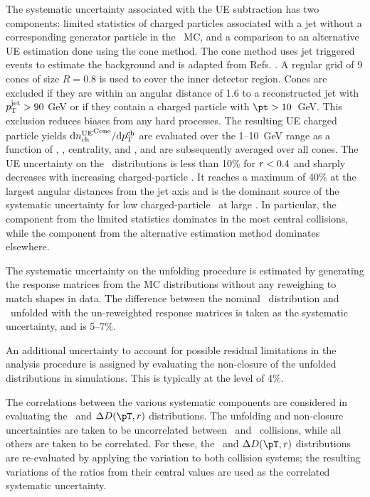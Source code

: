 The systematic uncertainty associated with the UE subtraction has two components: limited statistics of charged particles associated with a jet without a corresponding generator particle in the \pbpb\ MC, and a comparison to an alternative UE estimation done using the cone method. The cone method uses jet triggered events to estimate the background and is adapted from Refs. \cite{Aaboud:2018hpb, Aaboud:2017bzv}. A regular grid of 9 cones of size $R = 0.8$ is used to cover the inner detector region. Cones are excluded if they are within an angular distance of 1.6 to a reconstructed jet with $\mbox{$p_{\mathrm{T}}^{\mathrm{jet}}$} > 90$ GeV or if they contain a charged particle with \mbox{$\pt > 10$ GeV}. This exclusion reduces biases from any hard processes. The resulting UE charged particle yields $\mathrm{d} \mbox{$n_{\mathrm{ch}}^{\mathrm{UE}}$}^{\mathrm{Cone}}/ \mathrm{d} \mbox{$p_{{\mathrm{T}}}^{\mathrm{ch}}$}$ are evaluated over the \mbox{1--10 GeV} range as a function of \pttrk, \ptjet, centrality, and \rvar, and are subsequently averaged over all cones. The UE uncertainty on the \Dptr\ distributions is less than 10\% for $\mbox{$r$} < 0.4$ and sharply decreases with increasing charged-particle \pT. It  reaches a maximum of 40\% at the largest angular distances from the jet axis and is the dominant source of the systematic uncertainty for low charged-particle \pt\ at large \rvar. In particular, the component from the limited statistics dominates in the most central collisions, while the component from the alternative estimation method dominates elsewhere.


The systematic uncertainty on the unfolding procedure is estimated by generating the response matrices from the MC distributions without any reweighing to match shapes in data. The difference between the nominal \Dptr\ distribution and \Dptr\ unfolded with the un-reweighted response matrices is taken as the systematic uncertainty, and is 5--7\%.

An additional uncertainty to account for possible residual limitations in the analysis procedure is assigned by evaluating the non-closure of the unfolded distributions in simulations. This is typically at the level of 4\%.

The correlations between the various systematic components are considered in evaluating the \RDptr\ and $\Delta\Dptr$ distributions. The unfolding and non-closure uncertainties are taken to be uncorrelated between \pp\ and \pbpb\ collisions, while all others are taken to be correlated. For these, the \RDptr\ and $\Delta\Dptr$ distributions are re-evaluated by applying the variation to both collision systems; the resulting variations of the ratios from their central values are used as the correlated systematic uncertainty. 

